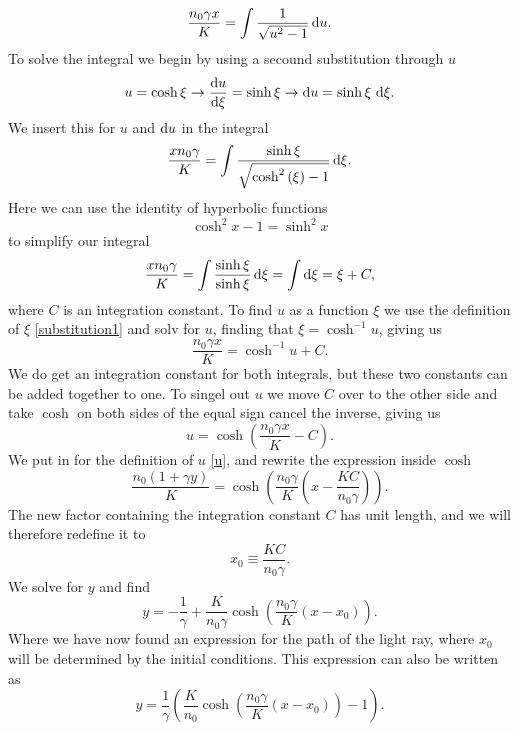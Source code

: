 \documentclass[12pt,twoside]{article}
\begin{document}
\begin{equation}
   \frac{n_0\gamma x}{K} = \int \frac{1}{\sqrt{u^2-1}} \dif u.
\end{equation}
To solve the integral we begin by using a secound substitution through $u$
\begin{equation}
  u = \cosh{\xi} \rightarrow \dv{u}{\xi} = \sinh{\xi} \rightarrow \dif u = \sinh{\xi} \, \dif \xi. \label{substitution1}
\end{equation}
We insert this for $u$ and $\dif u$ in the integral
\begin{equation}
   \frac{xn_0\gamma}{K} = \int \frac{\sinh{\xi}}{\sqrt{\cosh^2{(\xi)}-1}} \dif \xi.
\end{equation}
Here we can use the identity of hyperbolic functions
\begin{equation}
\cosh^2{x} -1 = \sinh^2{x}
\end{equation}
to simplify our integral
\begin{equation}
   \frac{xn_0\gamma}{K} = \int \frac{\sinh{\xi}}{\sinh{\xi}} \dif \xi = \int \dif \xi = \xi + C,
\end{equation}
where $C$ is an integration constant.
To find $u$ as a function $\xi$ we use the definition of $\xi$ \eqref{substitution1} and solv for $u$, finding that $\xi = \cosh^{-1}{u}$, giving us
\begin{equation}
   \frac{n_0\gamma x}{K} = \cosh^{-1}{u} + C.
\end{equation}
We do get an integration constant for both integrals, but these two constants can be added together to one. To singel out $u$ we move $C$ over to the other side and take $\cosh{}$ on both sides of the equal sign cancel the inverse, giving us
\begin{equation}
   u = \cosh{\left(\frac{n_0\gamma x}{K}-C\right)}.
\end{equation}
We put in for the definition of $u$ \eqref{u}, and rewrite the expression inside $\cosh{}$
\begin{equation}
   \frac{n_0\left(1+\gamma y\right)}{K} = \cosh{\left(\frac{n_0\gamma}{K}\left(x-\frac{KC}{n_0\gamma}\right)\right)}.
\end{equation}
The new factor containing the integration constant $C$ has unit length, and we will therefore redefine it to
\begin{equation}
  x_0 \equiv \frac{KC}{n_0\gamma} .
\end{equation}
We solve for $y$ and find
\begin{equation}
   y = -\frac{1}{\gamma} + \frac{K}{n_0\gamma}\cosh{\left(\frac{n_0\gamma}{K}\left(x-x_0\right)\right)}.
\end{equation}
Where we have now found an expression for the path of the light ray, where $x_0$ will be determined by the initial conditions. This expression can also be written as
\begin{equation}
   y = \frac{1}{\gamma}\left(\frac{K}{n_0}\cosh{\left(\frac{n_0\gamma}{K}\left(x-x_0\right)\right)}-1\right). \label{2b}
\end{equation}
\end{document}
